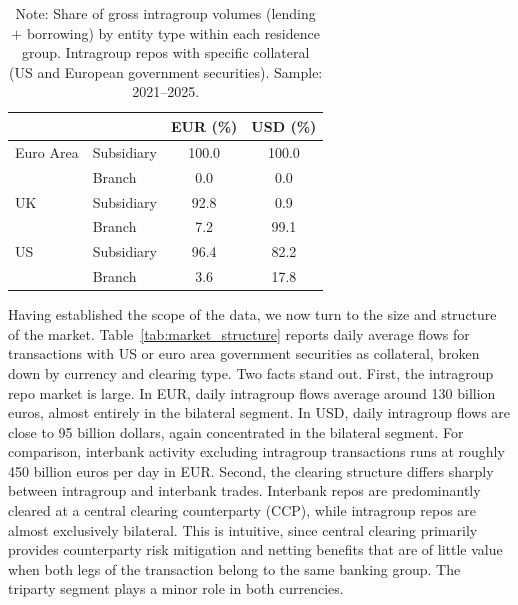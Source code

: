 \documentclass[english, 11pt, oneside, legal]{article}
\begin{document}
\begin{table}[t]
\centering
\caption{Share of intragroup activity by entity type and residence}
\label{tab:sub_branch}
\begin{tabular}{llcc}
\hline
& & EUR (\%) & USD (\%) \\
\hline
Euro Area & Subsidiary & 100.0 & 100.0 \\
          & Branch     &   0.0 &   0.0 \\
UK        & Subsidiary &  92.8 &   0.9 \\
          & Branch     &   7.2 &  99.1 \\
US        & Subsidiary &  96.4 &  82.2 \\
          & Branch     &   3.6 &  17.8 \\
\hline
\end{tabular}
\caption*{\footnotesize Note: Share of gross intragroup volumes (lending $+$ borrowing) by entity type within each residence group. Intragroup repos with specific collateral (US and European government securities). Sample: 2021--2025.}
\end{table}

Having established the scope of the data, we now turn to the size and structure of the market. Table~\ref{tab:market_structure} reports daily average flows for transactions with US or euro area government securities as collateral, broken down by currency and clearing type. Two facts stand out. First, the intragroup repo market is large. In EUR, daily intragroup flows average around 130 billion euros, almost entirely in the bilateral segment. In USD, daily intragroup flows are close to 95 billion dollars, again concentrated in the bilateral segment. For comparison, interbank activity excluding intragroup transactions runs at roughly 450 billion euros per day in EUR. Second, the clearing structure differs sharply between intragroup and interbank trades. Interbank repos are predominantly cleared at a central clearing counterparty (CCP), while intragroup repos are almost exclusively bilateral. This is intuitive, since central clearing primarily provides counterparty risk mitigation and netting benefits that are of little value when both legs of the transaction belong to the same banking group. The triparty segment plays a minor role in both currencies.
\end{document}
